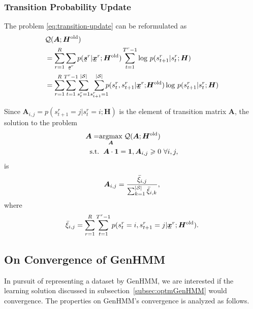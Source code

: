 \documentclass[letterpaper]{article} %
\newcommand{\ubar}[1]{\mkern2mu\underline{\mkern-2mu #1\mkern-2mu}\mkern2mu}
\newcommand{\ubmr}[2]{\ubar{\bm{#1}}^{#2}}
\newcommand{\smtr}[3]{{#1}^{#3}_{#2}}
\begin{document}
\subsubsection{Transition Probability Update}
The problem \eqref{eq:transition-update} can be reformulated as
\begin{align}
  &\Qq(\bm{A}; \bm{H}^{\mathrm{old}})\nonumber \\
  &= \sum_{r=1}^{R} \sum_{\ubmr{s}{r}}{p(\ubmr{s}{r}| \ubmr{x}{r}; \bm{H}^{\mathrm{old}})} \sum_{t=1}^{T^{r}-1}\log\,p(\smtr{s}{t+1}{r}|\smtr{s}{t}{r}; \bm{H}) \nonumber \\
  &= \sum_{r=1}^{R} \hspace{-0.1cm}\sum_{t=1}^{T^{r}-1}\hspace{-0.1cm} \sum_{\smtr{s}{t}{r}=1}^{|\Ss|}\hspace{-0.05cm}\sum_{\smtr{s}{t+1}{r}=1}^{|\Ss|}\hspace{-0.2cm}{p(\smtr{s}{t}{r}, \smtr{s}{t+1}{r}| \ubmr{x}{r};\hspace{-0.05cm} \bm{H}^{\mathrm{old}})} \log\,p(\smtr{s}{t+1}{r}|\smtr{s}{t}{r}; \bm{H})
\end{align}

Since $\bm{A}_{i, j}  = p(\smtr{s}{t+1}{r}=j|\smtr{s}{t}{r}=i; \bm{H})$ is the element of transition matrix $\bm{A}$, the solution to the problem
\begin{align}\label{eq:update-transition-prob}
  \bm{A} = &\underset{\bm{A}}{\operatorname{argmax}}\; \mathcal{Q}(\bm{A}; \bm{H}^{\mathrm{old}}) \nonumber \\
  \mathrm{s.t.} &\hspace{0.2cm} \bm{A} \cdot \bm{1} = \bm{1}, \bm{A}_{i,j} \geqslant 0 \,\, \forall i,j,
\end{align}
is
\begin{equation}
  \bm{A}_{i,j} = \frac{\bar{\xi}_{i,j}}{\sum_{k = 1}^{|\mathcal{S}|} \bar{\xi}_{i,k}},
\end{equation}
where
\begin{equation}\label{eq:update-transition-solt}
  \bar{\xi}_{i,j} = \sum_{r= 1}^{R} \sum_{t= 1}^{T^{r}-1}{p(\smtr{s}{t}{r}=i, \smtr{s}{t+1}{r}=j| \ubmr{x}{r}; \bm{H}^{\mathrm{old}})}.
\end{equation}
\subsection{On Convergence of GenHMM}
In pursuit of representing a dataset by GenHMM,  we are interested if the learning solution discussed in subsection~\ref{subsec:optmGenHMM} would convergence. The properties on GenHMM's convergence is analyzed as follows.
\end{document}
